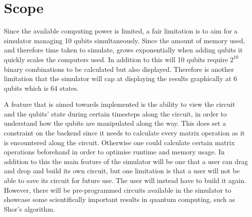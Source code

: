 \section{Scope}
\begin{comment}
    Since the available computing power is very limited, a fair limitation is to aim at a simulator managing 10 qubits simultaneously. Det är både backend och frontend. Kan inte förenkla genom att multiplicera matriser i förväg eftersom vi vill ha med alla steg, inte kunna spara sina egna circuits, men inbyggda circuits typ shor's osv. svårt att visa statevector, bara mäter i absoluta slutet i början av applikationen, kan inte visa 10 qubits i grafer max 6 st verkar rimligt, samt timestep endast till 6 qubits då det blir för svårt att visa grafiskt med fler qubits, programmet är tänkt till gymnasie, högskola/universitets-nivå för fritids/projektsbruk
\end{comment}
Since the available computing power is limited, a fair limitation is to aim for a simulator managing 10 qubits simultaneously. Since the amount of memory used, and therefore time taken to simulate, grows exponentially when adding qubits it quickly scales the computers used. In addition to this will 10 qubits require $2^{10}$ binary combinations to be calculated but also displayed. Therefore is another limitation that the simulator will cap at displaying the results graphically at 6 qubits which is 64 states. 

A feature that is aimed towards implemented is the ability to view the circuit and the qubits' state during certain timesteps along the circuit, in order to understand how the qubits are manipulated along the way. This does set a constraint on the backend since it needs to calculate every matrix operation as it is encountered along the circuit. Otherwise one could calculate certain matrix operations beforehand in order to optimise runtime and memory usage. In addition to this the main feature of the simulator will be one that a user can drag and drop and build its own circuit, but one limitation is that a user will not be able to save its circuit for future use. The user will instead have to build it again. However, there will be pre-programmed circuits available in the simulator to showcase some scientifically important results in quantum computing, such as Shor's algorithm.